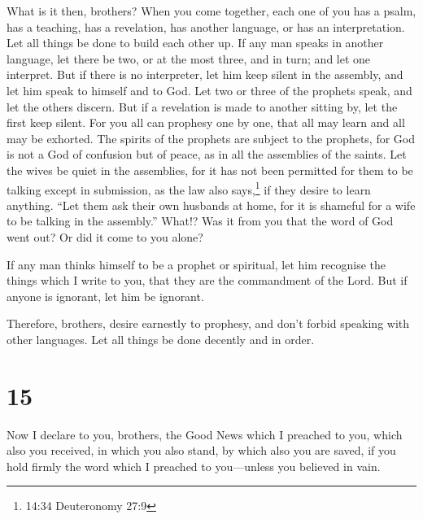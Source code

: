  What is it then, brothers? When you come together, each
one of you has a psalm, has a teaching, has a revelation, has another
language, or has an interpretation. Let all things be done to build each
other up.  If any man speaks in another language, let there
be two, or at the most three, and in turn; and let one interpret.
 But if there is no interpreter, let him keep silent in the
assembly, and let him speak to himself and to God.  Let two
or three of the prophets speak, and let the others discern.
 But if a revelation is made to another sitting by, let the
first keep silent.  For you all can prophesy one by one,
that all may learn and all may be exhorted.  The spirits of
the prophets are subject to the prophets,  for God is not a
God of confusion but of peace, as in all the assemblies of the saints.
 Let the wives be quiet in the assemblies, for it has not
been permitted for them to be talking except in submission, as the law
also says,\footnote{14:34 Deuteronomy 27:9}  if they desire
to learn anything. ``Let them ask their own husbands at home, for it is
shameful for a wife to be talking in the assembly.'' 
What!? Was it from you that the word of God went out? Or did it come to
you alone?

 If any man thinks himself to be a prophet or spiritual,
let him recognise the things which I write to you, that they are the
commandment of the Lord.  But if anyone is ignorant, let
him be ignorant.

 Therefore, brothers, desire earnestly to prophesy, and
don't forbid speaking with other languages.  Let all things
be done decently and in order.

\hypertarget{section-14}{%
\section{15}\label{section-14}}

 Now I declare to you, brothers, the Good News which I
preached to you, which also you received, in which you also stand,
 by which also you are saved, if you hold firmly the word
which I preached to you---unless you believed in vain.

